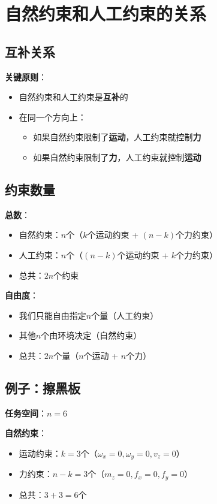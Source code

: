 \documentclass[12pt,a4paper]{article}
\begin{document}
\section{自然约束和人工约束的关系}

\subsection{互补关系}

\textbf{关键原则}：
\begin{itemize}
\item 自然约束和人工约束是\textbf{互补}的
\item 在同一个方向上：
\begin{itemize}
\item 如果自然约束限制了\textbf{运动}，人工约束就控制\textbf{力}
\item 如果自然约束限制了\textbf{力}，人工约束就控制\textbf{运动}
\end{itemize}
\end{itemize}

\subsection{约束数量}

\textbf{总数}：
\begin{itemize}
\item 自然约束：$n$个（$k$个运动约束 + $(n-k)$个力约束）
\item 人工约束：$n$个（$(n-k)$个运动约束 + $k$个力约束）
\item 总共：$2n$个约束
\end{itemize}

\textbf{自由度}：
\begin{itemize}
\item 我们只能自由指定$n$个量（人工约束）
\item 其他$n$个由环境决定（自然约束）
\item 总共：$2n$个量（$n$个运动 + $n$个力）
\end{itemize}

\subsection{例子：擦黑板}

\textbf{任务空间}：$n = 6$

\textbf{自然约束}：
\begin{itemize}
\item 运动约束：$k = 3$个（$\omega_x = 0, \omega_y = 0, v_z = 0$）
\item 力约束：$n-k = 3$个（$m_z = 0, f_x = 0, f_y = 0$）
\item 总共：$3 + 3 = 6$个
\end{itemize}
\end{document}

